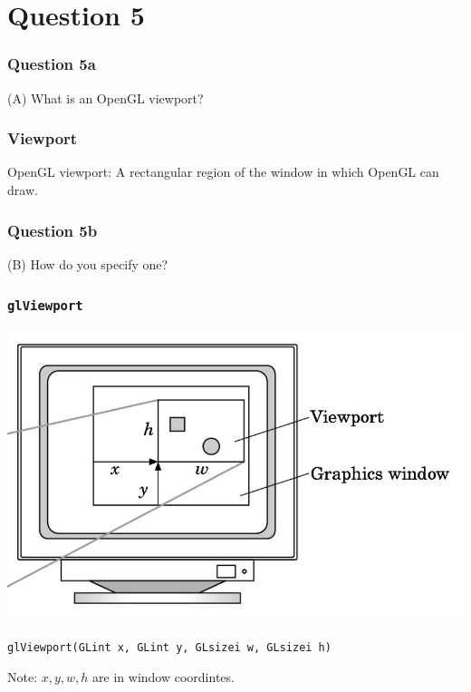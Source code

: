 \documentclass{beamer}
\begin{document}
\section{Question 5}

\begin{frame}
    \frametitle{Question 5a}

    (A) What is an OpenGL viewport?
\end{frame}

\begin{frame}
    \frametitle{Viewport}

    \begin{tcolorbox}
        OpenGL viewport: A rectangular region of the window in which OpenGL can draw.
    \end{tcolorbox}

\end{frame}

\begin{frame}
    \frametitle{Question 5b}

    (B) How do you specify one?
\end{frame}

\begin{frame}
    \frametitle{\texttt{glViewport}}

    \begin{center}
        \includegraphics[scale=0.3]{viewport.png}
    \end{center}

    \begin{tcolorbox}
        \begin{center}
            \texttt{glViewport(GLint x, GLint y, GLsizei w, GLsizei h)}
        \end{center}
    \end{tcolorbox}

    Note: $x,y,w,h$ are in window coordintes.

\end{frame}
\end{document}

